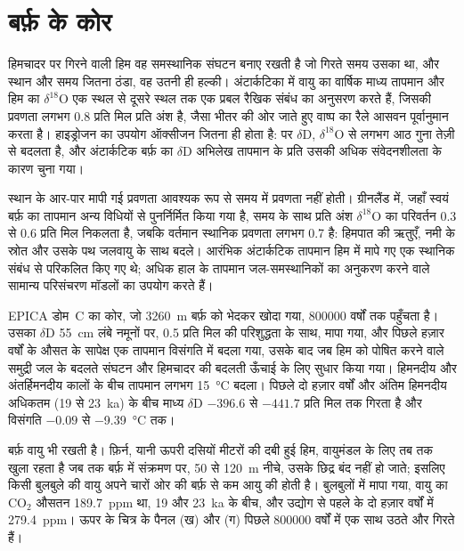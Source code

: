 \section{बर्फ़ के कोर}\label{sec:b2:climate-proxies:ice}

हिमचादर पर गिरने वाली हिम वह समस्थानिक संघटन बनाए रखती है जो गिरते समय उसका था, और
स्थान और समय जितना ठंडा, वह उतनी ही हल्की। अंटार्कटिका में वायु का वार्षिक माध्य तापमान और
हिम का $\delta^{18}$O एक स्थल से दूसरे स्थल तक एक प्रबल रैखिक संबंध का अनुसरण करते हैं, जिसकी
प्रवणता लगभग \num{0.8} प्रति मिल प्रति अंश है, जैसा भीतर की ओर जाते हुए वाष्प का रैले आसवन
पूर्वानुमान करता है। हाइड्रोजन का उपयोग ऑक्सीजन जितना ही होता है:  पर $\delta$D, $\delta^{18}$O से लगभग आठ गुना तेज़ी से बदलता है, और
अंटार्कटिक बर्फ़ का $\delta$D अभिलेख तापमान के प्रति उसकी अधिक संवेदनशीलता के कारण चुना गया।

स्थान के आर-पार मापी गई प्रवणता आवश्यक रूप से समय में प्रवणता नहीं होती। ग्रीनलैंड में, जहाँ स्वयं बर्फ़ का
तापमान अन्य विधियों से पुनर्निर्मित किया गया है, समय के साथ प्रति अंश $\delta^{18}$O का परिवर्तन
0.3 से \num{0.6} प्रति मिल निकलता है, जबकि वर्तमान स्थानिक प्रवणता लगभग
\num{0.7} है: हिमपात की ऋतुएँ, नमी के स्रोत और उसके पथ जलवायु के साथ
बदले। आरंभिक अंटार्कटिक तापमान हिम में मापे गए एक स्थानिक संबंध से परिकलित किए गए थे;
अधिक हाल के तापमान जल-समस्थानिकों का अनुकरण करने वाले सामान्य परिसंचरण मॉडलों का उपयोग करते हैं।

EPICA डोम~C का कोर, जो \qty{3260}{m} बर्फ़ को भेदकर खोदा गया, \num{800000} वर्षों तक पहुँचता है। उसका
$\delta$D \qty{55}{cm} लंबे नमूनों पर, \num{0.5} प्रति मिल की परिशुद्धता के साथ, मापा गया, और
पिछले हज़ार वर्षों के औसत के सापेक्ष एक तापमान विसंगति में बदला गया, उसके बाद जब
हिम को पोषित करने वाले समुद्री जल के बदलते संघटन और हिमचादर की बदलती
ऊँचाई के लिए सुधार किया गया। हिमनदीय और अंतर्हिमनदीय कालों के बीच तापमान लगभग
\qty{15}{\celsius} बदला। पिछले दो हज़ार वर्षों और अंतिम हिमनदीय अधिकतम (\num{19} से
\qty{23}{ka}) के बीच माध्य $\delta$D $-396.6$ से $-441.7$ प्रति मिल तक गिरता है और विसंगति
$-0.09$ से \qty{-9.39}{\celsius} तक।

बर्फ़ वायु भी रखती है। फ़िर्न, यानी ऊपरी दसियों मीटरों की दबी हुई हिम, वायुमंडल के लिए तब तक खुला रहता है
जब तक बर्फ़ में संक्रमण पर, 50 से \qty{120}{m} नीचे, उसके छिद्र बंद नहीं हो जाते; इसलिए किसी बुलबुले की वायु
अपने चारों ओर की बर्फ़ से कम आयु की होती है। बुलबुलों में मापा गया, वायु का CO$_2$ औसतन
\qty{189.7}{ppm} था, \num{19} और \qty{23}{ka} के बीच, और उद्योग से पहले के दो हज़ार वर्षों में
\qty{279.4}{ppm}। ऊपर के चित्र के पैनल (ख) और (ग) पिछले \num{800000} वर्षों में एक साथ उठते
और गिरते हैं।

